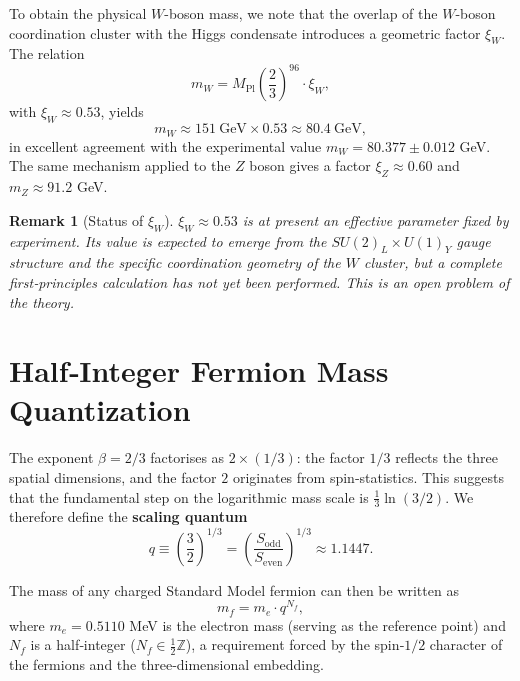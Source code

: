 \documentclass[12pt,a4paper]{article}
\newtheorem{remark}{Remark}
\begin{document}
	To obtain the physical \(W\)-boson mass, we note that the overlap of the \(W\)-boson coordination cluster with the Higgs condensate introduces a geometric factor \(\xi_W\).  The relation
	\begin{equation}
		m_W = M_{\mathrm{Pl}} \left(\frac{2}{3}\right)^{96} \cdot \xi_W,
		\label{eq:mw}
	\end{equation}
	with \(\xi_W \approx 0.53\), yields
	\begin{equation}
		m_W \approx 151\ \mathrm{GeV} \times 0.53 \approx 80.4\ \mathrm{GeV},
	\end{equation}
	in excellent agreement with the experimental value \(m_W = 80.377 \pm 0.012\) GeV.  The same mechanism applied to the \(Z\) boson gives a factor \(\xi_Z \approx 0.60\) and \(m_Z \approx 91.2\) GeV.
	
	\begin{remark}[Status of \(\xi_W\)]
		\(\xi_W \approx 0.53\) is at present an effective parameter fixed by experiment.  Its value is expected to emerge from the \(SU(2)_L \times U(1)_Y\) gauge structure and the specific coordination geometry of the \(W\) cluster, but a complete first‑principles calculation has not yet been performed.  This is an open problem of the theory.
	\end{remark}
	
	\section{Half‑Integer Fermion Mass Quantization}
	
	The exponent \(\beta = 2/3\) factorises as \(2 \times (1/3)\): the factor \(1/3\) reflects the three spatial dimensions, and the factor \(2\) originates from spin‑statistics.  This suggests that the fundamental step on the logarithmic mass scale is \(\frac{1}{3}\ln(3/2)\).  We therefore define the \textbf{scaling quantum}
	\begin{equation}
		q \equiv \left(\frac{3}{2}\right)^{1/3} = \left(\frac{S_{\mathrm{odd}}}{S_{\mathrm{even}}}\right)^{1/3} \approx 1.1447.
	\end{equation}
	
	The mass of any charged Standard Model fermion can then be written as
	\begin{equation}
		\boxed{m_f = m_e \cdot q^{N_f}},
		\label{eq:mass-quantization}
	\end{equation}
	where \(m_e = 0.5110\) MeV is the electron mass (serving as the reference point) and \(N_f\) is a half‑integer (\(N_f \in \frac{1}{2}\mathbb{Z}\)), a requirement forced by the spin‑\(1/2\) character of the fermions and the three‑dimensional embedding.
	
\end{document}
